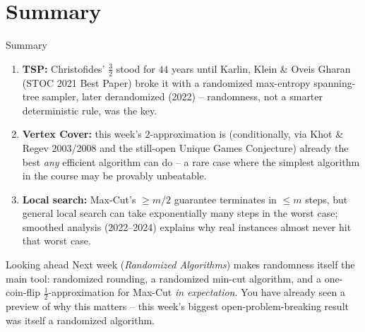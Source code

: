 \documentclass[11pt,aspectratio=169]{beamer}
\begin{document}
\section{Summary}

\begin{frame}{Summary}
  \small
  \begin{enumerate}
    \item \textbf{TSP:} Christofides' $\tfrac32$ stood for $44$ years until Karlin, Klein
    \& Oveis Gharan (STOC 2021 Best Paper) broke it with a randomized max-entropy
    spanning-tree sampler, later derandomized (2022) -- randomness, not a smarter
    deterministic rule, was the key.
    \item \textbf{Vertex Cover:} this week's $2$-approximation is (conditionally, via
    Khot \& Regev 2003/2008 and the still-open Unique Games Conjecture) already the best
    \emph{any} efficient algorithm can do -- a rare case where the simplest algorithm in
    the course may be provably unbeatable.
    \item \textbf{Local search:} Max-Cut's $\ge m/2$ guarantee terminates in $\le m$
    steps, but general local search can take exponentially many steps in the worst case;
    smoothed analysis (2022--2024) explains why real instances almost never hit that
    worst case.
  \end{enumerate}
  \begin{alertblock}{Looking ahead}
    Next week (\emph{Randomized Algorithms}) makes randomness itself the main tool:
    randomized rounding, a randomized min-cut algorithm, and a one-coin-flip
    $\tfrac12$-approximation for Max-Cut \emph{in expectation}. You have already seen a
    preview of why this matters -- this week's biggest open-problem-breaking result was
    itself a randomized algorithm.
  \end{alertblock}
\end{frame}
\end{document}
